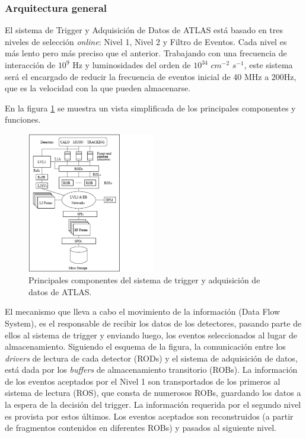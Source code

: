 \subsubsection{Arquitectura general}

   El sistema de Trigger y Adquisici\'on de Datos\cite{TDRtdaq} de ATLAS est\'a basado en tres niveles de selecci\'on \emph{online}: Nivel 1, Nivel 2 y Filtro de Eventos. Cada nivel es m\'as lento pero m\'as preciso que el anterior. Trabajando con una frecuencia de interacci\'on de $10^{9}$ Hz y luminosidades del orden de $10^{34}$ $cm^{-2}$ $s^{-1}$, este sistema ser\'a el encargado de reducir la frecuencia de eventos inicial de 40 MHz a 200Hz, que es la velocidad con la que pueden almacenarse. 

   En la figura \ref{fig:TDAQ} se muestra un vista simplificada de los principales componentes y funciones.  

\begin{figure}[!h]
\begin{center}
\includegraphics[width=0.5\textwidth]{Fig3/paint_TDAQ.pdf}
\caption{Principales componentes del sistema de trigger y adquisici\'on de datos de ATLAS. } 
\label{fig:TDAQ}
\end{center}
\end{figure}

   El mecanismo que lleva a cabo el movimiento de la informaci\'on (Data Flow System), es el responsable de recibir los datos de los detectores, pasando parte de ellos al sistema de trigger y enviando luego, los eventos seleccionados al lugar de almacenamiento. Siguiendo el esquema de la figura, la comunicaci\'on entre los \emph{drivers} de lectura %
de cada detector (RODs) y el sistema de adquisici\'on de datos, est\'a dada por los \emph{buffers} de almacenamiento transitorio (ROBs). La informaci\'on de los eventos aceptados por el Nivel 1 son transportados de los primeros al sistema de lectura (ROS), que consta de numerosos ROBs, guardando los datos a la espera de la decisi\'on del trigger. La informaci\'on requerida por el segundo nivel es provista por estos \'ultimos. Los eventos aceptados son reconstruidos (a partir de fragmentos contenidos en diferentes ROBs) y pasados al siguiente nivel.

